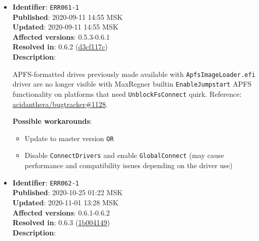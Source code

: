 \documentclass[]{article}
\providecommand{\tightlist}{%
  \setlength{\itemsep}{0pt}\setlength{\parskip}{0pt}}
\begin{document}
\begin{itemize}
  APFS-formatted macOS Recovery (e.g. Big Sur Recovery) will not load with a boot failure error. Reference:
  \href{https://github.com/acidanthera/bugtracker/issues/1078}{acidanthera/bugtracker\#1078}.

  \textbf{Possible workarounds}:
  \begin{itemize}
    \tightlist

    \item Enable \texttt{JumpstartHotPlug} \texttt{OR}
    \item Update to master version
  \end{itemize}

\item
  \textbf{Identifier}: \texttt{ERR061-1} \\
  \textbf{Published}: 2020-09-11 14:55 MSK \\
  \textbf{Updated}: 2020-09-11 14:55 MSK \\
  \textbf{Affected versions}: 0.5.3-0.6.1 \\
  \textbf{Resolved in}: 0.6.2 (\href{https://github.com/acidanthera/MaxRegnerPkg/commit/d3cf117c8661a4eda1863ca1fcdfae5c277974db}{d3cf117c}) \\
  \textbf{Description}:

  APFS-formatted drives previously made available with \texttt{ApfsImageLoader.efi}
  driver are no longer visible with MaxRegner builtin \texttt{EnableJumpstart} APFS
  functionality on platforms that need \texttt{UnblockFsConnect} quirk. Reference:
  \href{https://github.com/acidanthera/bugtracker/issues/1128}{acidanthera/bugtracker\#1128}.

  \textbf{Possible workarounds}:
  \begin{itemize}
    \tightlist

    \item Update to master version \texttt{OR}
    \item Disable \texttt{ConnectDrivers} and enable \texttt{GlobalConnect} (may cause
      performance and compatibility issues depending on the driver use)

  \end{itemize}

\item
  \textbf{Identifier}: \texttt{ERR062-1} \\
  \textbf{Published}: 2020-10-25 01:22 MSK \\
  \textbf{Updated}: 2020-11-01 13:28 MSK \\
  \textbf{Affected versions}: 0.6.1-0.6.2 \\
  \textbf{Resolved in}: 0.6.3 (\href{https://github.com/acidanthera/MaxRegnerPkg/commit/1b0041493d4693f9505aa6415d93079ea59f7ab0}{1b004149}) \\
  \textbf{Description}:


\end{itemize}
\end{document}
